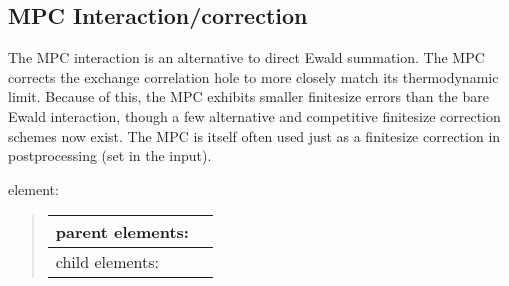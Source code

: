 \documentclass[letterpaper,10pt,english]{sphinxmanual}
\begin{document}
\subsection{MPC Interaction/correction}
\label{\detokenize{hamiltonianobservable:mpc-interaction-correction}}
The MPC interaction is an alternative to direct Ewald summation. The MPC
corrects the exchange correlation hole to more closely match its
thermodynamic limit. Because of this, the MPC exhibits smaller
finite\sphinxhyphen{}size errors than the bare Ewald interaction, though a few
alternative and competitive finite\sphinxhyphen{}size correction schemes now exist.
The MPC is itself often used just as a finite\sphinxhyphen{}size correction in
post\sphinxhyphen{}processing (set  in the input).

 element:
\begin{quote}


\begin{savenotes}\sphinxattablestart
\centering
\begin{tabulary}{\linewidth}[t]{|T|T|}
\hline

parent elements:
&
\\
\hline
child elements:
&
\\
\hline
\end{tabulary}
\par
\sphinxattableend\end{savenotes}
\end{quote}
\end{document}
